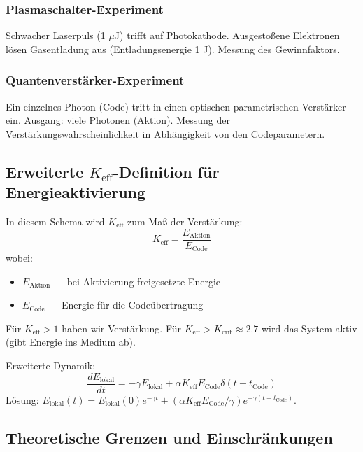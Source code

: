 \documentclass[11pt,a4paper]{article}
\begin{document}
	\subsubsection{Plasmaschalter-Experiment}
	Schwacher Laserpuls (1 $\mu$J) trifft auf Photokathode. Ausgestoßene Elektronen lösen Gasentladung aus (Entladungsenergie 1 J). Messung des Gewinnfaktors.
	
	\subsubsection{Quantenverstärker-Experiment}
	Ein einzelnes Photon (Code) tritt in einen optischen parametrischen Verstärker ein. Ausgang: viele Photonen (Aktion). Messung der Verstärkungswahrscheinlichkeit in Abhängigkeit von den Codeparametern.
	
	\subsection{Erweiterte $K_{\mathrm{eff}}$-Definition für Energieaktivierung}
	
	In diesem Schema wird $K_{\mathrm{eff}}$ zum Maß der Verstärkung:
	\begin{equation}
		K_{\mathrm{eff}} = \frac{E_{\text{Aktion}}}{E_{\text{Code}}}
	\end{equation}
	wobei:
	\begin{itemize}
		\item $E_{\text{Aktion}}$ — bei Aktivierung freigesetzte Energie
		\item $E_{\text{Code}}$ — Energie für die Codeübertragung
	\end{itemize}
	
	Für $K_{\mathrm{eff}} > 1$ haben wir Verstärkung. Für $K_{\mathrm{eff}} > K_{\text{crit}} \approx 2.7$ wird das System aktiv (gibt Energie ins Medium ab).
	
	Erweiterte Dynamik:
	\begin{equation}
		\frac{dE_{\text{lokal}}}{dt} = -\gamma E_{\text{lokal}} + \alpha K_{\mathrm{eff}} E_{\text{Code}} \delta(t - t_{\text{Code}})
	\end{equation}
	Lösung: $E_{\text{lokal}}(t) = E_{\text{lokal}}(0) e^{-\gamma t} + (\alpha K_{\mathrm{eff}} E_{\text{Code}}/\gamma) e^{-\gamma(t-t_{\text{Code}})}$.
	
	\subsection{Theoretische Grenzen und Einschränkungen}
	
\end{document}
